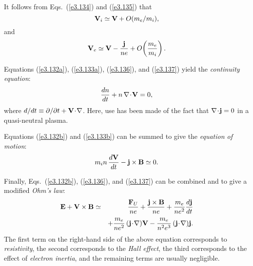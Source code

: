 It follows from Eqs.~(\ref{e3.134}) and (\ref{e3.135}) that
\begin{equation}\label{e3.136}
{\bf V}_i \simeq {\bf V} + O(m_e/m_i),
\end{equation}
and
\begin{equation}\label{e3.137}
{\bf V}_e \simeq {\bf V} - \frac{{\bf j}}{ne} + O\!\left(\frac{m_e}{m_i}\right).
\end{equation}

Equations (\ref{e3.132a}), (\ref{e3.133a}), (\ref{e3.136}), and (\ref{e3.137}) yield the
{\em continuity equation}:
\begin{equation}
\frac{dn}{dt} + n\,\nabla\!\cdot\!{\bf V} = 0,
\end{equation}
where $d/dt \equiv \partial/\partial t + {\bf V}\!\cdot\!\nabla$. Here, use has
been made of the fact that  $\nabla\!\cdot\!{\bf j} =0$ in a quasi-neutral
plasma.

Equations (\ref{e3.132b}) and (\ref{e3.133b}) can be summed  to give the
{\em equation of motion}:
\begin{equation}
m_i n\,\frac{d{\bf V}}{dt} -{\bf j}\times {\bf B} \simeq 0.
\end{equation}

Finally, Eqs.~(\ref{e3.132b}), (\ref{e3.136}), and (\ref{e3.137}) can be combined and to give
a modified  {\em Ohm's law}:
\begin{eqnarray}
{\bf E} + {\bf V}\times {\bf B}& \simeq& \frac{{\bf F}_U}{ne} + \frac{{\bf j}\times{\bf B}}
{ne} + \frac{m_e}{n e^2} \frac{d{\bf j}}{dt}\\[0.5ex]
 &&+ \frac{m_e}{ne^2}\, ({\bf j}\!\cdot\!\nabla){\bf V} - \frac{m_e}{n^2 e^3}\,
({\bf j}\!\cdot\!\nabla){\bf j}.\nonumber
\end{eqnarray}
The first term on the right-hand side of the above equation corresponds to
{\em resistivity}, the second corresponds to the {\em Hall effect}, the
third corresponds to the effect of {\em electron inertia}, and the
remaining terms are usually negligible.  

